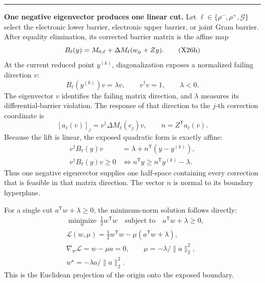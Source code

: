 \documentclass[9pt,letterpaper,twocolumn]{article}
\newcommand{\conceptbreak}{%
  \par\smallskip\noindent
  {\color{black!30}\rule{\columnwidth}{0.35pt}}%
  \par\smallskip
}
\begin{document}
\conceptbreak
\textbf{One negative eigenvector produces one linear cut.}
Let \(\ell\in\{\rho^-,\rho^+,\mathcal G\}\) select the electronic lower
barrier, electronic upper barrier, or joint Gram barrier.  After equality
elimination, its corrected barrier matrix is the affine map
\[
B_\ell(y)=M_{0,\ell}+\Delta M_\ell(w_{\rm p}+Zy).
\tag{X26h}
\]
At the current reduced point \(y^{(k)}\), diagonalization exposes a normalized
failing direction \(v\):
\[
B_\ell(y^{(k)})v=\lambda v,
\qquad v^\dagger v=1,
\qquad \lambda<0.
\tag{X26i}
\]
The eigenvector \(v\) identifies the failing matrix direction, and
\(\lambda\) measures its differential-barrier violation.  The response of
that direction to the \(j\)-th correction coordinate is
\[
[a_\ell(v)]_j=v^\dagger\Delta M_\ell(e_j)v,
\qquad n=Z^{\mathsf T}a_\ell(v).
\tag{X26j}
\]
Because the lift is linear, the exposed quadratic form is exactly affine:
\[
\begin{aligned}
v^\dagger B_\ell(y)v
&=\lambda+n^{\mathsf T}(y-y^{(k)}),\\
v^\dagger B_\ell(y)v\geq0
&\Longleftrightarrow
n^{\mathsf T}y\geq n^{\mathsf T}y^{(k)}-\lambda.
\end{aligned}
\tag{X26k}
\]
Thus one negative eigenvector supplies one half-space containing every
correction that is feasible in that matrix direction.  The vector \(n\) is
normal to its boundary hyperplane.

For a single cut \(a^{\mathsf T}w+\lambda\geq0\), the minimum-norm solution
follows directly:
{\footnotesize
\[
\begin{aligned}
&\underset{w}{\operatorname{minimize}}\ \tfrac12w^{\mathsf T}w
\quad\text{subject to}\quad a^{\mathsf T}w+\lambda\geq0,\\
&\mathcal L(w,\mu)=\tfrac12w^{\mathsf T}w
-\mu(a^{\mathsf T}w+\lambda),\\
&\nabla_w\mathcal L=w-\mu a=0,
\qquad
\mu=-\lambda/\lVert a\rVert_2^2,\\
&\boxed{w^\star=-\lambda a/\lVert a\rVert_2^2.}
\end{aligned}
\tag{X26d}
\]
}
This is the Euclidean projection of the origin onto the exposed boundary.
\end{document}
